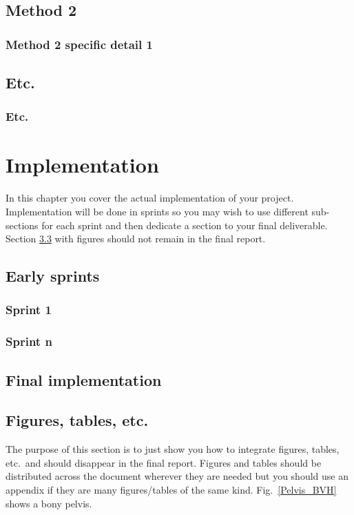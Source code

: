 \documentclass[a4paper, oneside, 11pt]{report}
\begin{document}
\section{Method 2}

\subsection{Method 2 specific detail 1}

\section{Etc.}

\subsection{Etc.}

\chapter{Implementation}\label{Impl}

In this chapter you cover the actual implementation of your project. Implementation will be done in sprints so you may wish to use different sub-sections for each sprint and then dedicate a section to your final deliverable. Section \ref{Figures} with figures  should not remain in the final report.

\section{Early sprints}
\subsection{Sprint 1}

\subsection{Sprint n}

\section{Final implementation}

\section{Figures, tables, etc.}
\label{Figures}

The purpose of this section is to just show you how to integrate figures, tables, etc.\ and should disappear in the final report. Figures and tables should be distributed across the document wherever they are needed but you should use an appendix if they are many figures/tables of the same kind. Fig.\ \ref{Pelvis_BVH} shows a bony pelvis.
\end{document}
